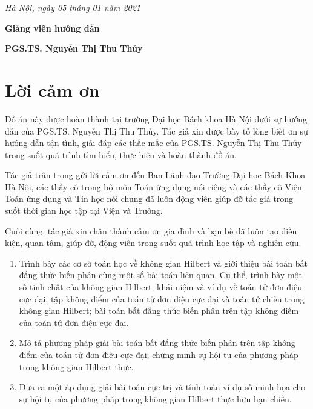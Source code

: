 \documentclass[14pt, oneside,A4paper]{book}
\theoremstyle{plain}
\renewcommand{\large}{\fontsize{14pt}{14pt}\selectfont}
\begin{document}
\bigbreak

\hspace{6.5cm}
\textit{ Hà Nội, ngày 05 tháng 01 năm 2021}

\bigbreak
\hspace{7.6cm} {\bf Giảng viên hướng dẫn}

\vspace{3 cm}
\hspace{6.5cm} {\bf PGS.TS. Nguyễn Thị Thu Thủy}
\large

\newpage
\chapter*{Lời cảm ơn}

\fontsize{22pt}{16pt}\selectfont
\fontsize{13pt}{16pt}\selectfont
\bigskip

Đồ án này được hoàn thành tại trường Đại học Bách khoa Hà Nội dưới sự hướng dẫn của PGS.TS. Nguyễn Thị Thu Thủy. Tác giả xin được bày tỏ lòng biết ơn sự hướng dẫn tận tình, giải đáp các thắc mắc của PGS.TS. Nguyễn Thị Thu Thủy trong suốt quá trình tìm hiểu, thực hiện và hoàn thành đồ án.

Tác giả trân trọng gửi lời cảm ơn đến Ban Lãnh đạo Trường Đại học Bách Khoa Hà Nội, các thầy cô trong bộ môn Toán ứng dụng nói riêng và các thầy cô Viện Toán ứng dụng và Tin học nói chung đã luôn động viên giúp đỡ tác giả trong suốt thời gian học tập tại Viện và Trường.

Cuối cùng, tác giả xin chân thành cảm ơn gia đình và bạn bè đã luôn tạo điều kiện, quan tâm, giúp đỡ, động viên trong suốt quá trình học tập và nghiên cứu.\\
\bigskip

\fontsize{22pt}{16pt}\selectfont
{}
\fontsize{13pt}{16pt}\selectfont
\bigskip

\begin{enumerate}
	\item Trình bày các cơ sở toán học về không gian Hilbert và giới thiệu bài toán bất đẳng thức biến phân cùng một số bài toán liên quan. Cụ thể, trình bày một số tính chất của không gian Hilbert; khái niệm và ví dụ về toán tử đơn điệu cực đại, tập không điểm của toán tử đơn điệu cực đại và toán tử chiếu trong không gian Hilbert; bài toán bất đẳng thức biến phân trên tập không điểm của toán tử đơn điệu cực đại.
	\item Mô tả  phương pháp giải bài toán bất đẳng thức biến phân trên tập không điểm của toán tử đơn điệu cực đại; chứng minh sự hội tụ của phương pháp trong không gian Hilbert thực.%
	\item Đưa ra một áp dụng giải bài toán cực trị và tính toán ví dụ số minh họa cho sự hội tụ của phương pháp trong không gian Hilbert thực hữu hạn chiều.%
\end{enumerate}
\end{document}
